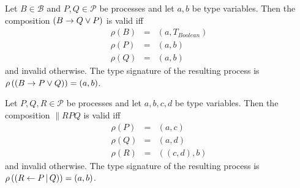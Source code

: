 \begin{definition}
\label{def:static_choice}
Let $B \in \mathcal{B}$ and $P, Q \in \mathcal{P}$ be processes and let $a, b$ be type variables. Then the composition $\left( B \to Q \vee P \right)$ is valid iff
\begin{eqnarray*}
  \rho \left( B \right) & = & \left( a, T_{Boolean} \right) \\
  \rho \left( P \right) & = & \left( a, b \right) \\
  \rho \left( Q \right) & = & \left( a, b \right)
\end{eqnarray*}
and invalid otherwise. The type signature of the resulting process is $\rho \left( \left( B \to P \vee Q \right) \right) = \left( a, b \right)$.

\hfill\qedsymbol
\end{definition}


\begin{definition}
Let $P, Q, R \in \mathcal{P}$ be processes and let $a, b, c, d$ be type variables. Then the composition $\parallel{R}{P}{Q}$ is valid iff
\begin{eqnarray*}
  \rho \left( P \right) & = & \left( a, c \right) \\
  \rho \left( Q \right) & = & \left( a, d \right) \\
  \rho \left( R \right) & = & \left( \left( c, d \right), b \right)
\end{eqnarray*}
and invalid otherwise. The type signature of the resulting process is $\rho \left( \left( R \gets P \, | \, Q \right) \right) = \left( a, b \right)$.

\hfill\qedsymbol
\end{definition}


